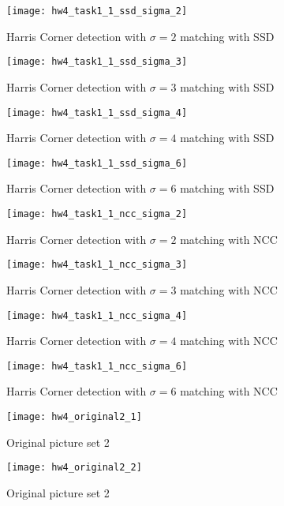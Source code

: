 \documentclass[11pt]{article}
\begin{document}
\begin{figure}[H]
\centering
\texttt{[image: hw4\_task1\_1\_ssd\_sigma\_2]}
\caption{Harris Corner detection with $\sigma = 2$ matching with SSD}
\label{}
\end{figure}
\begin{figure}[H]
\centering
\texttt{[image: hw4\_task1\_1\_ssd\_sigma\_3]}
\caption{Harris Corner detection with $\sigma = 3$ matching with SSD}
\label{}
\end{figure}
\begin{figure}[H]
\centering
\texttt{[image: hw4\_task1\_1\_ssd\_sigma\_4]}
\caption{Harris Corner detection with $\sigma = 4$ matching with SSD}
\label{}
\end{figure}
\begin{figure}[H]
\centering
\texttt{[image: hw4\_task1\_1\_ssd\_sigma\_6]}
\caption{Harris Corner detection with $\sigma = 6$ matching with SSD}
\label{}
\end{figure}

\begin{figure}[H]
\centering
\texttt{[image: hw4\_task1\_1\_ncc\_sigma\_2]}
\caption{Harris Corner detection with $\sigma = 2$ matching with NCC}
\label{}
\end{figure}
\begin{figure}[H]
\centering
\texttt{[image: hw4\_task1\_1\_ncc\_sigma\_3]}
\caption{Harris Corner detection with $\sigma = 3$ matching with NCC}
\label{}
\end{figure}
\begin{figure}[H]
\centering
\texttt{[image: hw4\_task1\_1\_ncc\_sigma\_4]}
\caption{Harris Corner detection with $\sigma = 4$ matching with NCC}
\label{}
\end{figure}
\begin{figure}[H]
\centering
\texttt{[image: hw4\_task1\_1\_ncc\_sigma\_6]}
\caption{Harris Corner detection with $\sigma = 6$ matching with NCC}
\label{}
\end{figure}



\begin{figure}[H]
\centering
\texttt{[image: hw4\_original2\_1]}
\caption{Original picture set 2}
\label{}
\end{figure}
\begin{figure}[H]
\centering
\texttt{[image: hw4\_original2\_2]}
\caption{Original picture set 2}
\label{}
\end{figure}
\end{document}

